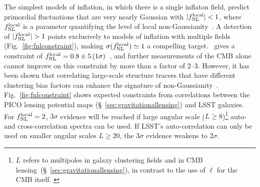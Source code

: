 \documentclass[PICOReport.tex]{subfiles}
\begin{document}
The simplest models of inflation, in which there is a single inflaton field, predict primordial fluctuations that are very nearly Gaussian with $|f^{\rm local}_{\rm NL}| <1$, where $f^{\rm local}_{\rm NL}$ is a parameter quantifying the level of local non-Gaussianity~\citep{?}. A detection of $|f^{\rm local}_{\rm NL}| >1$ points exclusively to models of inflation with multiple fields (Fig.~\ref{fig:fnlconstraint}), making $\sigma (f^{\rm local}_{\rm NL}) \simeq 1$ a compelling target. \planck\ gives a constraint of $f^{\rm local}_{\rm NL} = 0.8 \pm 5 \, (1\sigma)$~\citep{planck2015_17}, and further measurements of the \ac{CMB} alone cannot improve on this constraint by more than a factor of 2--3. However, it has been shown that correlating large-scale structure tracers that have different clustering bias factors can enhance the signature of non-Gaussianity~\citep{2009PhRvL.102b1302S,2018PhRvD..97l3540S,2008PhRvD..77l3514D}. Fig.~\ref{fig:fnlconstraint} shows expected constraints from correlations between the PICO lensing potential maps (\S~\ref{sec:gravitationallensing}) and LSST galaxies. For $f^{\rm local}_{\rm NL}=2$, $3\sigma$ evidence will be reached if large angular scale ($L\ge 8$)\footnote{$L$ refers to multipoles in galaxy clustering fields and in CMB lensing~(\S~\ref{sec:gravitationallensing}), in contrast to the use of $\ell$  for the CMB itself. \label{foot:L}} auto- and cross-correlation spectra can be used. If LSST's auto-correlation can only be used on smaller angular scales $L\ge 20$, the $3\sigma$ evidence weakens to $2\sigma$. 
\end{document}
